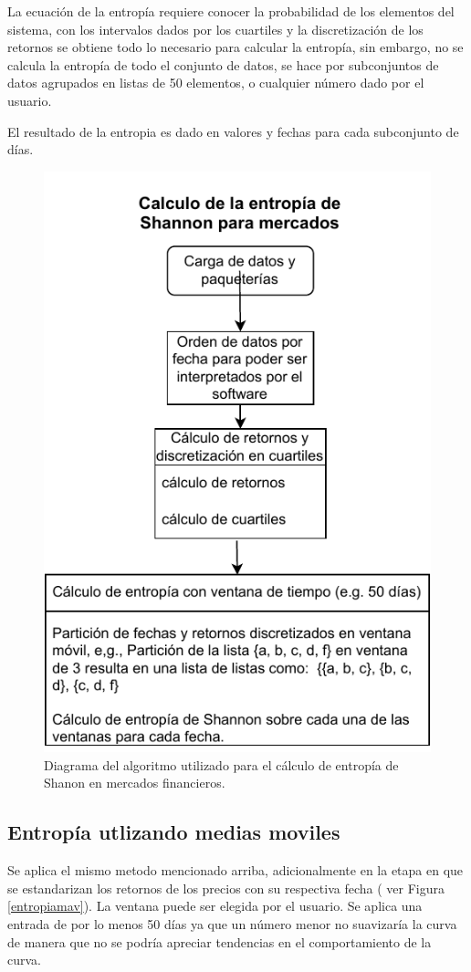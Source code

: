 La ecuación de la entropía requiere conocer la probabilidad de los elementos del sistema, con los intervalos dados por los cuartiles y la discretización de los retornos se obtiene todo lo necesario para calcular la entropía, sin embargo, no se calcula la entropía de todo el conjunto de datos, se hace por subconjuntos de datos agrupados en listas de 50 elementos, o cualquier número dado por el usuario.

El resultado de la entropia es dado en valores y fechas para cada subconjunto de días.

\begin{figure}
	\includegraphics[width=0.7\linewidth]{figures/diagrama_entropia1}
	\caption{Diagrama del algoritmo utilizado para el c\'alculo de entrop\'ia de Shanon en mercados financieros.}
	\label{diagramaentropia1}
\end{figure}

\subsection{Entropía utlizando medias moviles}

Se aplica el mismo metodo mencionado arriba, adicionalmente en la etapa en que se estandarizan los retornos de los precios con su respectiva fecha ( ver Figura \ref{entropiamav}). La ventana puede ser elegida por el usuario. Se aplica una entrada de por lo menos 50 días ya que un número menor no suavizaría la curva de manera que no se podría apreciar tendencias en el comportamiento de la curva.





